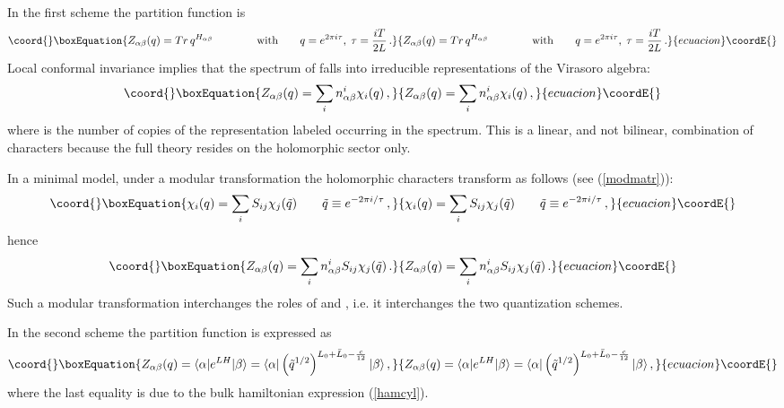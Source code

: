 \documentclass[a4paper,12pt]{report}
\begin{document}
In the first scheme the partition function is
\begin{equation}\coord{}\boxEquation{
Z_{\alpha\beta}(q)=Tr\, q^{H_{\alpha\beta}}\qquad\qquad \textrm{with}\qquad q= e^{2\pi
i\tau},\;\tau=\frac{iT}{2L}\,.
}{
Z_{\alpha\beta}(q)=Tr\, q^{H_{\alpha\beta}}\qquad\qquad \textrm{with}\qquad q= e^{2\pi
i\tau},\;\tau=\frac{iT}{2L}\,.
}{ecuacion}\coordE{}\end{equation}
Local conformal invariance implies that the spectrum of \coordHE{} falls into irreducible representations
of the Virasoro algebra:
\begin{equation}\coord{}\boxEquation{
Z_{\alpha\beta}(q)=\sum_{i}n_{\alpha\beta}^{i}\chi_{i}(q)\,,
}{
Z_{\alpha\beta}(q)=\sum_{i}n_{\alpha\beta}^{i}\chi_{i}(q)\,,
}{ecuacion}\coordE{}\end{equation}
where \coordHE{} is the number of copies of the representation labeled \coordHE{} occurring in the spectrum.
This is a linear, and not bilinear, combination of characters because the full theory resides on the holomorphic
sector only.

In a minimal model, under a modular transformation \coordHE{} the holomorphic characters transform
as follows (see (\ref{modmatr})):
\begin{equation}\coord{}\boxEquation{
\chi_{i}(q)=\sum_{i}S_{ij}\chi_{j}(\tilde{q})\qquad \tilde{q}\equiv e^{-2\pi i/\tau}\,,
}{
\chi_{i}(q)=\sum_{i}S_{ij}\chi_{j}(\tilde{q})\qquad \tilde{q}\equiv e^{-2\pi i/\tau}\,,
}{ecuacion}\coordE{}\end{equation}
hence
\begin{equation}\coord{}\boxEquation{\label{schemes}
Z_{\alpha\beta}(q)=\sum_{i}n_{\alpha\beta}^{i}S_{ij}\chi_{j}(\tilde{q})\,.
}{Z_{\alpha\beta}(q)=\sum_{i}n_{\alpha\beta}^{i}S_{ij}\chi_{j}(\tilde{q})\,.
}{ecuacion}\coordE{}\end{equation}
Such a modular transformation interchanges the roles of \coordHE{} and \coordHE{}, i.e. it interchanges the two quantization
schemes.

In the second scheme the partition function is expressed as
\begin{equation}\coord{}\boxEquation{
Z_{\alpha\beta}(q)=\langle\alpha|e^{LH}|\beta\rangle=\langle\alpha|\left(\tilde{q}^{1/2}\right)^{L_{0}+\bar{L}_{0}-\frac{c}{12}}|\beta\rangle
\,,
}{
Z_{\alpha\beta}(q)=\langle\alpha|e^{LH}|\beta\rangle=\langle\alpha|\left(\tilde{q}^{1/2}\right)^{L_{0}+\bar{L}_{0}-\frac{c}{12}}|\beta\rangle
\,,
}{ecuacion}\coordE{}\end{equation}
where the last equality is due to the bulk hamiltonian expression (\ref{hamcyl}).
\end{document}
